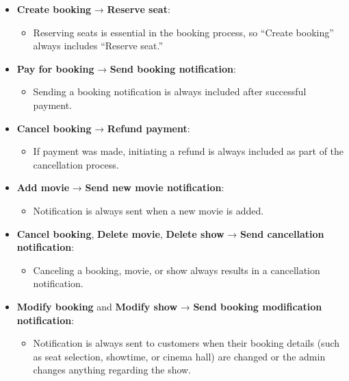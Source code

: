 \begin{itemize}
\item
\protect{}\label{EPVpqZ9cUV39DJBy1NPOB}
\textbf{Create booking} → \textbf{Reserve seat}:

\begin{itemize}
\item
Reserving seats is essential in the booking process, so ``Create booking'' always includes ``Reserve seat.''
\end{itemize}
\item
\protect{}\label{jS_ZfbY8HXpjbBmM23ILp}
\textbf{Pay for booking} → \textbf{Send booking notification}:

\begin{itemize}
\item
Sending a booking notification is always included after successful payment.
\end{itemize}
\item
\protect{}\label{-M7-TZy4_Tud3VSsXcQfc}
\textbf{Cancel booking} → \textbf{Refund payment}:

\begin{itemize}
\item
If payment was made, initiating a refund is always included as part of the cancellation process.
\end{itemize}
\item
\protect{}\label{Mmdrlh4Hi9d3WCol_x5VI}
\textbf{Add movie} → \textbf{Send new movie notification}:

\begin{itemize}
\item
Notification is always sent when a new movie is added.
\end{itemize}
\item
\protect{}\label{hsqLE56jZCZAIl2jthnU3}
\textbf{Cancel booking}, \textbf{Delete movie}, \textbf{Delete show} → \textbf{Send cancellation notification}:

\begin{itemize}
\item
Canceling a booking, movie, or show always results in a cancellation notification.
\end{itemize}
\item
\protect{}\label{Mmdrlh4Hi9d3WCol_x5VI}
\textbf{Modify booking} and \textbf{Modify show} → \textbf{Send booking modification notification}:

\begin{itemize}
\item
Notification is always sent to customers when their booking details (such as seat selection, showtime, or cinema hall) are changed or the admin changes anything regarding the show.
\end{itemize}
\end{itemize}

